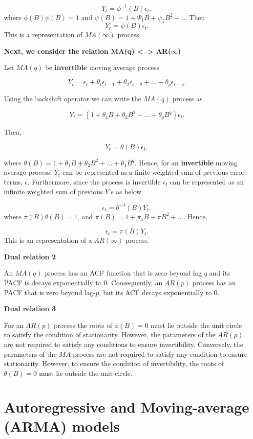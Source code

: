 \documentclass[
  11pt,
  a4paper,
]{report}
\begin{document}
\[Y_t = \phi^{-1}(B)\epsilon_t,\] where \(\phi(B)\psi(B)=1\) and
\(\psi(B)=1+\Psi_1B+\psi_2B^2+...\) Then \[Y_t=\psi(B)\epsilon_t.\] This
is a representation of \(MA(\infty)\) process.

\textbf{Next, we consider the relation MA(q) \textless--\textgreater{}
AR(}\(\infty\)\textbf{)}

Let \(MA(q)\) be \textbf{invertible} moving average process

\[Y_t = \epsilon_t + \theta_t\epsilon_{t-1}+\theta_2\epsilon_{t-2}+...+\theta_p\epsilon_{t-q}.\]

Using the backshift operator we can write the \(MA(q)\) process as

\[Y_t = (1+\theta_1B+\theta_2B^2-...+\theta_qB^q)\epsilon_t.\]

Then,

\[Y_t = \theta(B)\epsilon_t,\]

where \(\theta(B)=1+\theta_1B+\theta_2B^2+...+\theta_1B^q.\) Hence, for
an \textbf{invertible} moving average process, \(Y_t\) can be
represented as a finite weighted sum of previous error terms,
\(\epsilon\). Furthermore, since the process is invertible
\(\epsilon_t\) can be represented as an infinite weighted sum of
previous \(Y\)'s as below

\[\epsilon_t=\theta^{-1}(B)Y_t,\] where \(\pi(B)\theta(B)=1\), and
\(\pi(B) = 1+\pi_1B+\pi B^2+...\). Hence,

\[\epsilon_t = \pi(B)Y_t.\] This is an representation of a
\(AR(\infty)\) process.

\textbf{Dual relation 2}

An \(MA(q)\) process has an ACF function that is zero beyond lag \(q\)
and its PACF is decays exponentially to 0. Consequently, an \(AR(p)\)
process has an PACF that is zero beyond lag-\(p\), but its ACF decays
exponentially to 0.

\textbf{Dual relation 3}

For an \(AR(p)\) process the roots of \(\phi(B)=0\) must lie outside the
unit circle to satisfy the condition of stationarity. However, the
parameters of the \(AR(p)\) are not required to satisfy any conditions
to ensure invertibility. Conversely, the parameters of the \(MA\)
process are not required to satisfy any condition to ensure
stationarity. However, to ensure the condition of invertibility, the
roots of \(\theta(B)=0\) must lie outside the unit circle.


\chapter{Autoregressive and Moving-average (ARMA)
models}\label{autoregressive-and-moving-average-arma-models}
\end{document}
